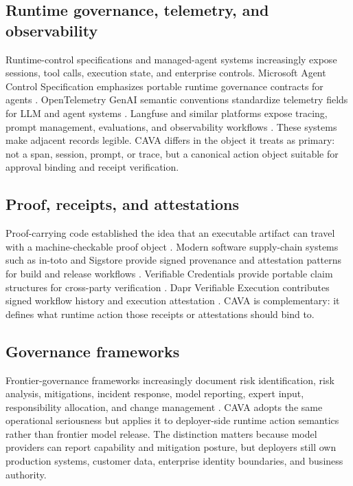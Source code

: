 \documentclass[11pt]{article}
\begin{document}
\subsection{Runtime governance, telemetry, and observability}

Runtime-control specifications and managed-agent systems increasingly expose sessions, tool calls, execution state, and enterprise controls. Microsoft Agent Control Specification emphasizes portable runtime governance contracts for agents \citep{microsoftacs2026}. OpenTelemetry GenAI semantic conventions standardize telemetry fields for LLM and agent systems \citep{otelgenai2026}. Langfuse and similar platforms expose tracing, prompt management, evaluations, and observability workflows \citep{langfuseobservability}. These systems make adjacent records legible. CAVA differs in the object it treats as primary: not a span, session, prompt, or trace, but a canonical action object suitable for approval binding and receipt verification.

\subsection{Proof, receipts, and attestations}

Proof-carrying code established the idea that an executable artifact can travel with a machine-checkable proof object \citep{necula1997pcc}. Modern software supply-chain systems such as in-toto and Sigstore provide signed provenance and attestation patterns for build and release workflows \citep{intoto2023,sigstore2024}. Verifiable Credentials provide portable claim structures for cross-party verification \citep{w3cvc2025}. Dapr Verifiable Execution contributes signed workflow history and execution attestation \citep{daprverifiable2026}. CAVA is complementary: it defines what runtime action those receipts or attestations should bind to.

\subsection{Governance frameworks}

Frontier-governance frameworks increasingly document risk identification, risk analysis, mitigations, incident response, model reporting, expert input, responsibility allocation, and change management \citep{openai2026fgf}. CAVA adopts the same operational seriousness but applies it to deployer-side runtime action semantics rather than frontier model release. The distinction matters because model providers can report capability and mitigation posture, but deployers still own production systems, customer data, enterprise identity boundaries, and business authority.
\end{document}

